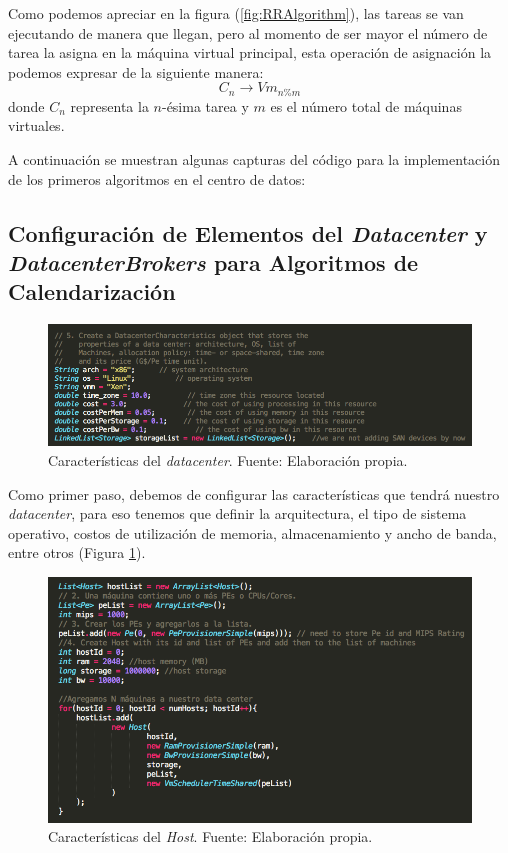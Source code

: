 Como podemos apreciar en la figura (\ref{fig:RRAlgorithm}), las tareas se van ejecutando de manera que llegan, pero al momento de ser mayor el número de tarea la asigna en la máquina virtual principal, esta operación de asignación la podemos expresar de la siguiente manera: $$C_n \rightarrow Vm_{n \% m}$$ donde $C_n$ representa la $n$-ésima tarea y $m$ es el número total de máquinas virtuales.

\newpage
A continuaci\'on se muestran algunas capturas del c\'odigo para la implementaci\'on de los primeros algoritmos en el centro de datos:


\subsection*{Configuración de Elementos del \textit{Datacenter} y \textit{DatacenterBrokers} para Algoritmos de Calendarización}

\renewcommand\thefigure{\arabic{figure}}
\begin{figure}[h!]
	\centering
	\includegraphics[scale=0.4]{media/caracteristicas_datacenter}
	\caption{Características del \textit{datacenter}. Fuente: Elaboración propia.}
	\label{fig:DCar}
\end{figure}


Como primer paso,  debemos de configurar las caracter\'isticas que tendrá nuestro \textit{datacenter}, para eso tenemos que definir la arquitectura, el tipo de sistema operativo, costos de utilizaci\'on de memoria, almacenamiento y ancho de banda, entre otros (Figura \ref{fig:DCar}).

\newpage

\renewcommand\thefigure{\arabic{figure}}
\begin{figure}[h!]
	\centering
	\includegraphics[scale=0.5]{media/caracteristicas_host}
	\caption{Características del \textit{Host}. Fuente: Elaboración propia.}
	\label{fig:HCar}
	
\end{figure}


